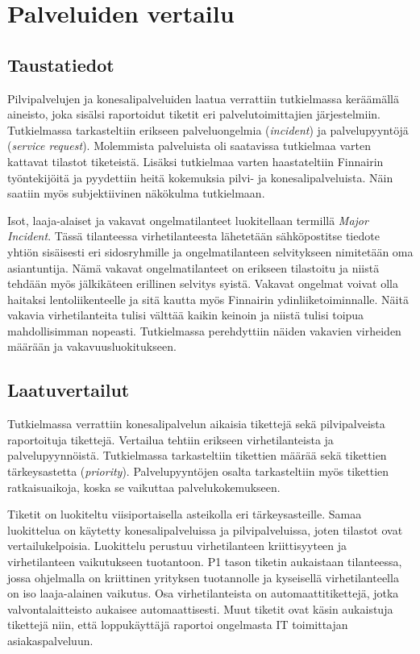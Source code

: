 \chapter{Palveluiden vertailu\label{vertailu}}

\section{Taustatiedot}
Pilvipalvelujen ja konesalipalveluiden laatua verrattiin tutkielmassa keräämällä aineisto, joka sisälsi raportoidut tiketit eri palvelutoimittajien järjestelmiin. Tutkielmassa tarkasteltiin erikseen palveluongelmia (\emph{incident}) ja palvelupyyntöjä (\emph{service request}). Molemmista palveluista oli saatavissa tutkielmaa varten kattavat tilastot tiketeistä. Lisäksi tutkielmaa varten haastateltiin Finnairin työntekijöitä ja pyydettiin heitä kokemuksia pilvi- ja konesalipalveluista. Näin saatiin myös subjektiivinen näkökulma tutkielmaan.

Isot, laaja-alaiset ja vakavat ongelmatilanteet luokitellaan termillä \emph{Major Incident}. Tässä tilanteessa virhetilanteesta lähetetään sähköpostitse tiedote yhtiön sisäisesti eri sidosryhmille ja ongelmatilanteen selvitykseen nimitetään oma asiantuntija. Nämä vakavat ongelmatilanteet on erikseen tilastoitu ja niistä tehdään myös jälkikäteen erillinen selvitys syistä. Vakavat ongelmat voivat olla haitaksi lentoliikenteelle ja sitä kautta myös Finnairin ydinliiketoiminnalle. Näitä vakavia virhetilanteita tulisi välttää kaikin keinoin ja niistä tulisi toipua mahdollisimman nopeasti. Tutkielmassa perehdyttiin näiden vakavien virheiden määrään ja vakavuusluokitukseen.
\section{Laatuvertailut}
Tutkielmassa verrattiin konesalipalvelun aikaisia tikettejä sekä pilvipalveista raportoituja tikettejä. Vertailua tehtiin erikseen virhetilanteista ja palvelupyynnöistä. Tutkielmassa tarkasteltiin tikettien määrää sekä tikettien tärkeysastetta (\emph{priority}). Palvelupyyntöjen osalta tarkasteltiin myös tikettien ratkaisuaikoja, koska se vaikuttaa palvelukokemukseen.

Tiketit on luokiteltu viisiportaisella asteikolla eri tärkeysasteille. Samaa luokittelua on käytetty konesalipalveluissa ja pilvipalveluissa, joten tilastot ovat vertailukelpoisia.  Luokittelu perustuu virhetilanteen kriittisyyteen ja virhetilanteen vaikutukseen tuotantoon. P1 tason tiketin aukaistaan tilanteessa, jossa ohjelmalla on kriittinen yrityksen tuotannolle ja kyseisellä virhetilanteella on iso laaja-alainen vaikutus. Osa virhetilanteista on automaattitikettejä, jotka valvontalaitteisto aukaisee automaattisesti. Muut tiketit ovat käsin aukaistuja tikettejä niin, että loppukäyttäjä raportoi ongelmasta IT toimittajan asiakaspalveluun. 

